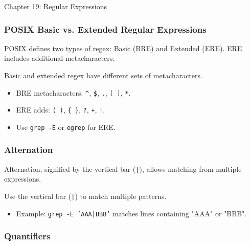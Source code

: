 \begin{notes}{Chapter 19: Regular Expressions}
\begin{highlight}
    \end{highlight}
    
    \subsubsection*{POSIX Basic vs. Extended Regular Expressions}
    
    POSIX defines two types of regex: Basic (BRE) and Extended (ERE). ERE includes additional metacharacters.
    
    \begin{highlight}
    
    Basic and extended regex have different sets of metacharacters.
    
    \begin{itemize}
        \item BRE metacharacters: \texttt{\^}, \texttt{\$}, \texttt{.}, \texttt{[ ]}, \texttt{*}.
        \item ERE adds: \texttt{( )}, \texttt{\{ \}}, \texttt{?}, \texttt{+}, \texttt{|}.
        \item Use \texttt{grep -E} or \texttt{egrep} for ERE.
    \end{itemize}
    
    \end{highlight}
    
    \subsubsection*{Alternation}
    
    Alternation, signified by the vertical bar (\texttt{|}), allows matching from multiple expressions.
    
    \begin{highlight}[Alternation]
    
    Use the vertical bar (\texttt{|}) to match multiple patterns.
    
    \begin{itemize}
        \item Example: \texttt{grep -E 'AAA|BBB'} matches lines containing "AAA" or "BBB".
    \end{itemize}
    
    \end{highlight}
    
    \subsubsection*{Quantifiers}
    

\end{notes}

